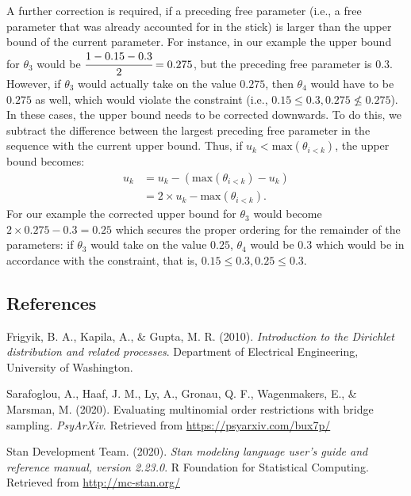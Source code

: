 \begin{appendix}
A further correction is required, if a preceding free parameter (i.e., a
free parameter that was already accounted for in the stick) is larger
than the upper bound of the current parameter. For instance, in our
example the upper bound for \(\theta_3\) would be
\(\cfrac{1 - 0.15 - 0.3}{2} = 0.275\), but the preceding free parameter
is \(0.3\). However, if \(\theta_3\) would actually take on the value
\(0.275\), then \(\theta_4\) would have to be \(0.275\) as well, which
would violate the constraint (i.e.,
\(0.15 \leq 0.3, 0.275 \nleq 0.275\)). In these cases, the upper bound
needs to be corrected downwards. To do this, we subtract the difference
between the largest preceding free parameter in the sequence with the
current upper bound. Thus, if \(u_k < \text{max}(\theta_{i < k})\), the
upper bound becomes: \begin{align}
u_k &= u_k - (\text{max}(\theta_{i < k}) - u_k) \\
    &= 2 \times u_k - \text{max}(\theta_{i < k}).
\end{align} For our example the corrected upper bound for \(\theta_3\)
would become \(2 \times 0.275 - 0.3 = 0.25\) which secures the proper
ordering for the remainder of the parameters: if \(\theta_3\) would take
on the value \(0.25\), \(\theta_4\) would be \(0.3\) which would be in
accordance with the constraint, that is,
\(0.15 \leq 0.3, 0.25 \leq 0.3\).

\hypertarget{references}{%
\subsection{References}\label{references}}

\begingroup
\setlength{\parindent}{-0.5in}
\setlength{\leftskip}{0.5in}

\hypertarget{refs}{}
\leavevmode\hypertarget{ref-frigyik2010introduction}{}%
Frigyik, B. A., Kapila, A., \& Gupta, M. R. (2010). \emph{Introduction
to the Dirichlet distribution and related processes}. Department of
Electrical Engineering, University of Washington.

\leavevmode\hypertarget{ref-sarafoglou2020evaluatingPreprint}{}%
Sarafoglou, A., Haaf, J. M., Ly, A., Gronau, Q. F., Wagenmakers, E., \&
Marsman, M. (2020). Evaluating multinomial order restrictions with
bridge sampling. \emph{PsyArXiv}. Retrieved from
\url{https://psyarxiv.com/bux7p/}

\leavevmode\hypertarget{ref-stan2020}{}%
Stan Development Team. (2020). \emph{Stan modeling language user's guide
and reference manual, version 2.23.0}. R Foundation for Statistical
Computing. Retrieved from \url{http://mc-stan.org/}

\endgroup
\end{appendix}
